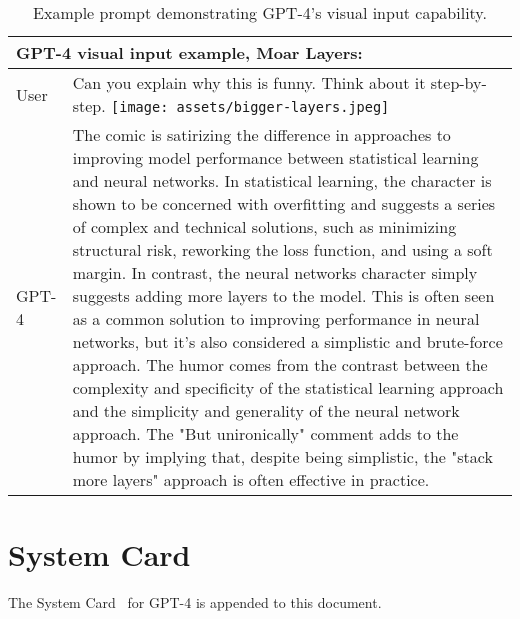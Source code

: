 \documentclass{article}
\begin{document}
\begin{table}
\begin{tabular}[]{p{0.5in}p{4.5in}}
\toprule
\multicolumn{2}{p{5in}}{
\textbf{GPT-4 visual input example, Moar Layers}:}\\
\midrule
User & Can you explain why this is funny. Think about it step-by-step.\newline\newline
\texttt{[image: assets/bigger-layers.jpeg]}\newline
\\
GPT-4 & The comic is satirizing the difference in approaches to improving model performance between statistical learning and neural networks.\newline
\newline
In statistical learning, the character is shown to be concerned with overfitting and suggests a series of complex and technical solutions, such as minimizing structural risk, reworking the loss function, and using a soft margin.\newline
\newline
In contrast, the neural networks character simply suggests adding more layers to the model. This is often seen as a common solution to improving performance in neural networks, but it's also considered a simplistic and brute-force approach.\newline
\newline
The humor comes from the contrast between the complexity and specificity of the statistical learning approach and the simplicity and generality of the neural network approach. The "But unironically" comment adds to the humor by implying that, despite being simplistic, the "stack more layers" approach is often effective in practice.\\
\bottomrule
\end{tabular}
\caption{Example prompt demonstrating GPT-4's visual input capability.}
\label{table:visual_input_moar}
\end{table}
\FloatBarrier

\section{System Card}

The System Card~\cite{mitchellModelCardsModel2019, greenSystemCardsNew2022} for GPT-4 is appended to this document.

 \clearpage
{}\label{systemcard}
 
\end{document}
